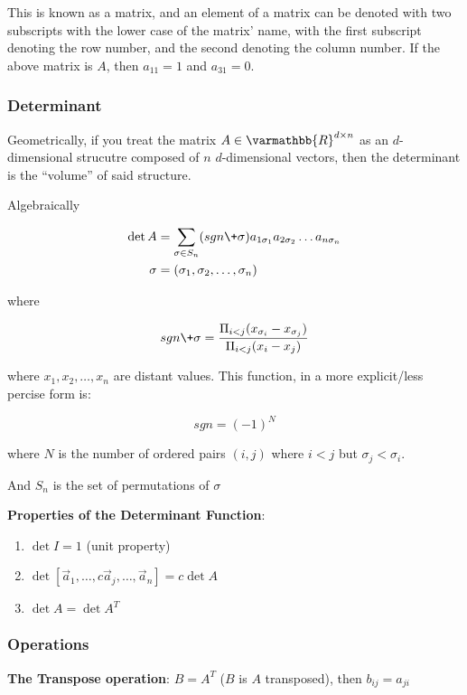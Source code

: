 \documentclass[11 pt, twoside]{article}
\begin{document}
This is known as a matrix, and an element of a matrix can be denoted with two
subscripts with the lower case of the matrix' name, with the first subscript denoting the row number, and the second denoting the
column number. If the above matrix is $A$, then $a_{11} = 1$ and $a_{31} = 0$.

\subsubsection{Determinant}

Geometrically, if you treat the matrix $A \in \varmathbb{R}^{d \times n}$ as an
$d$-dimensional strucutre composed of $n$ $d$-dimensional vectors, then the
determinant is the ``volume'' of said structure.

Algebraically

\begin{align*}
\det A &= \sum_{\sigma \in S_n} (sgn \+ \sigma) a_{1 \sigma_1} a_{2 \sigma_2}
\dots a_{n\sigma_n}\\
\sigma &= (\sigma_1, \sigma_2, \dots, \sigma_n)
\end{align*}

where 

$$sgn \+ \sigma = \frac{\Pi_{i < j} (x_{\sigma_i} - x_{\sigma_j})}{\Pi_{i
< j} (x_i - x_j)}$$

where $x_1, x_2, \dots, x_n$ are distant values. This function, in a more
explicit/less percise form is:

$$sgn = (-1)^N$$

where $N$ is the number of ordered pairs $(i, j)$ where $i < j$ but $\sigma_j <
\sigma_i$.

And $S_n$ is the set of permutations of $\sigma$

\textbf{Properties of the Determinant Function}:
\begin{enumerate}
\item $\det I = 1$ (unit property)
\item $\det[\vec{a}_1, \dots, c\vec{a}_j, \dots, \vec{a}_n] = c \det A$
\item $\det A = \det A^T$
\end{enumerate}


\subsubsection{Operations}

\textbf{The Transpose operation}: $B = A^T$ ($B$ is $A$ transposed),
then $b_{ij} = a_{ji}$
\end{document}
